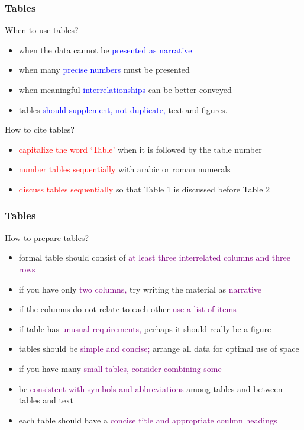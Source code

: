 \documentclass[newPxFont,sthlmFooter]{beamer}
\newcommand{\fs}{\footnotesize}
\begin{document}
\begin{frame}\frametitle{Tables}
\begin{exampleblock}{\small When to use tables?}
  \begin{itemize}
  \fs
  \item when the data cannot be \textcolor{blue}{presented as narrative}
  \item when many \textcolor{blue}{precise numbers} must be presented
  \item when meaningful \textcolor{blue}{interrelationships} can be better conveyed
  \item tables \textcolor{blue}{should supplement, not duplicate,} text and figures.
  \end{itemize}
\end{exampleblock}

\begin{alertblock}{\small How to cite tables?}
  \begin{itemize}
  \fs
  \item \textcolor{red}{capitalize the word `Table'} when it is followed by the table number
  \item \textcolor{red}{number tables sequentially} with arabic or roman numerals
  \item \textcolor{red}{discuss tables sequentially} so that Table 1 is discussed before Table 2
  \end{itemize}
\end{alertblock}

\end{frame}

\begin{frame}\frametitle{Tables}
\vspace{-0.25cm}
\begin{block}{\small How to prepare tables?}
  \begin{itemize}
  \fs
  \item formal table should consist of \textcolor{purple}{at least three interrelated columns and three rows}
  \item if you have only \textcolor{purple}{two columns,} try writing the material as \textcolor{purple}{narrative}
  \item if the columns do not relate to each other \textcolor{purple}{use a list of items}
  \item if table has \textcolor{purple}{unusual requirements,} perhaps it should really be a figure
  \item tables should be \textcolor{purple}{simple and concise;} arrange all data for optimal use of space
  \item if you have many \textcolor{purple}{small tables, consider combining some}
  \item be \textcolor{purple}{consistent with symbols and abbreviations} among tables and between tables and text
  \item each table should have a \textcolor{purple}{concise title and appropriate coulmn headings}
  \end{itemize}
\end{block}
\end{frame}
\end{document}
